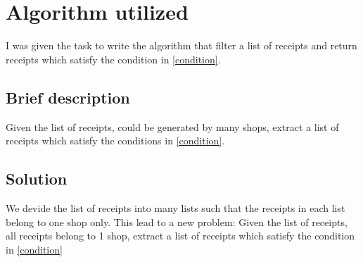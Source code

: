 \section{Algorithm utilized}

I was given the task to write the algorithm that filter a list of receipts and return receipts which satisfy the condition in  \ref{condition}. 

\subsection{Brief description}
Given the list of receipts, could be generated by many shops, extract a list of receipts which satisfy the conditions in \ref{condition}.

\subsection{Solution}
We devide the list of receipts into many lists such that the receipts in each list belong to one shop only. This lead to a new problem: 
Given the list of receipts, all receipts belong to 1 shop, extract a list of receipts which satisfy the condition in \ref{condition}